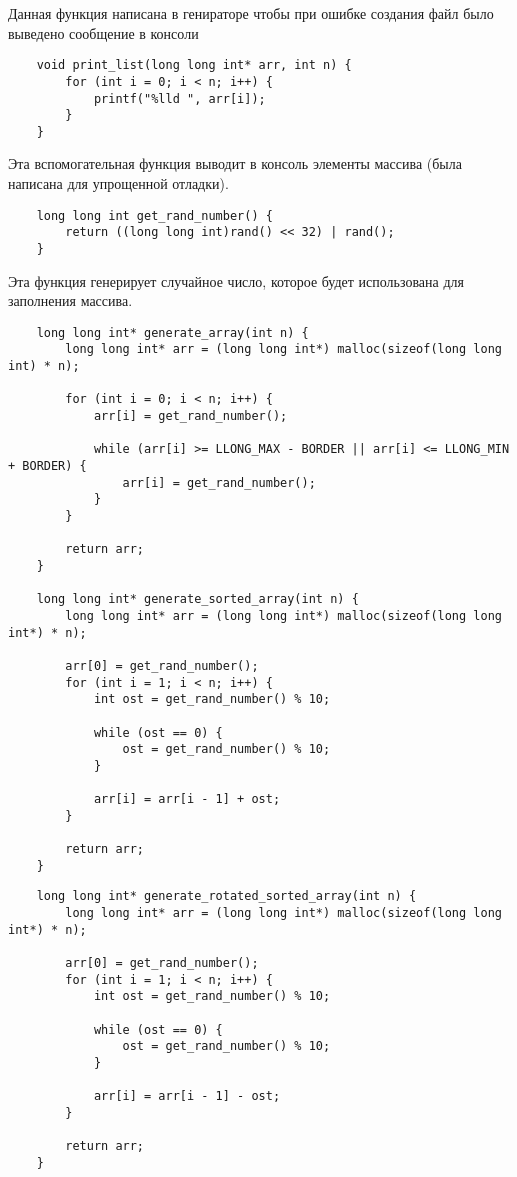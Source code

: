 \documentclass[a4paper,12pt,titlepage,finall]{article}
\begin{document}
Данная функция написана в генираторе чтобы при ошибке создания файл было выведено сообщение в консоли

\begin{verbatim}
    void print_list(long long int* arr, int n) {
        for (int i = 0; i < n; i++) {
            printf("%lld ", arr[i]);
        }
    }
\end{verbatim}

Эта вспомогательная функция выводит в консоль элементы массива (была написана для упрощенной отладки).

\begin{verbatim}
    long long int get_rand_number() {
        return ((long long int)rand() << 32) | rand();
    }
\end{verbatim}

Эта функция генерирует случайное число, которое будет использована для заполнения массива.

\begin{verbatim}
    long long int* generate_array(int n) {
        long long int* arr = (long long int*) malloc(sizeof(long long int) * n);

        for (int i = 0; i < n; i++) {
            arr[i] = get_rand_number();

            while (arr[i] >= LLONG_MAX - BORDER || arr[i] <= LLONG_MIN + BORDER) {
                arr[i] = get_rand_number();
            }
        }

        return arr;
    }

    long long int* generate_sorted_array(int n) {
        long long int* arr = (long long int*) malloc(sizeof(long long int*) * n);

        arr[0] = get_rand_number();
        for (int i = 1; i < n; i++) {
            int ost = get_rand_number() % 10;
            
            while (ost == 0) {
                ost = get_rand_number() % 10;
            }

            arr[i] = arr[i - 1] + ost;
        }

        return arr;
    }
\end{verbatim}

\newpage

\begin{verbatim}
    long long int* generate_rotated_sorted_array(int n) {
        long long int* arr = (long long int*) malloc(sizeof(long long int*) * n);

        arr[0] = get_rand_number();
        for (int i = 1; i < n; i++) {
            int ost = get_rand_number() % 10;
            
            while (ost == 0) {
                ost = get_rand_number() % 10;
            }

            arr[i] = arr[i - 1] - ost;
        }

        return arr;
    }
\end{verbatim}
\end{document}

